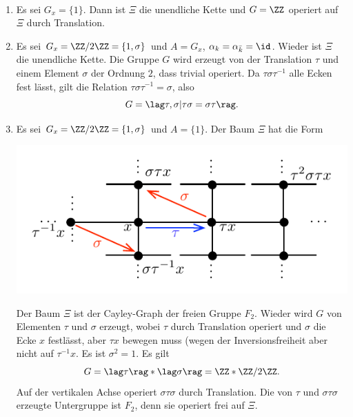 \BSP\
\begin{enumerate}
\item Es sei $G_x=\{1\}$. Dann ist $\Xi$ die unendliche Kette
und $G=\ZZ$ operiert auf $\Xi$ durch Translation.
\item Es sei $G_x=\ZZ/2\ZZ=\{1,\sigma\}$ und $A=G_x$,
$\alpha_k=\alpha_{\bar{k}}=\id$. Wieder ist $\Xi$ die
unendliche Kette. Die Gruppe $G$ wird erzeugt von der
Translation $\tau$ und einem Element $\sigma$ der Ordnung $2$,
dass trivial operiert.
Da $\tau\sigma\tau^{-1}$ alle Ecken fest lässt, gilt die Relation
$\tau\sigma\tau^{-1}=\sigma$, also
\[
G = \lag \tau,\sigma | \tau\sigma=\sigma\tau \rag.
\]
\item Es sei $G_x=\ZZ/2\ZZ=\{1,\sigma\}$ und $A=\{1\}$.
Der Baum $\Xi$ hat die Form
\begin{center}
	\includegraphics{grugraImages/XiF2}
\end{center}
Der Baum $\Xi$ ist der
Cayley-Graph der freien Gruppe $F_2$.
Wieder wird $G$ von Elementen $\tau$ und $\sigma$ erzeugt, wobei
$\tau$ durch Translation operiert und $\sigma$ die Ecke $x$
festlässt, aber $\tau x$ bewegen muss (wegen der Inversionsfreiheit
aber nicht auf $\tau^{-1} x$.
Es ist $\sigma^2=1$. Es gilt
\[
G = \lag \tau \rag * \lag \sigma \rag
= \ZZ * \ZZ/2\ZZ.
\]
Auf der vertikalen Achse operiert $\sigma\tau\sigma$ durch
Translation. Die von $\tau$ und $\sigma\tau\sigma$ erzeugte
Untergruppe ist $F_2$, denn sie operiert frei auf $\Xi$.
\end{enumerate}

